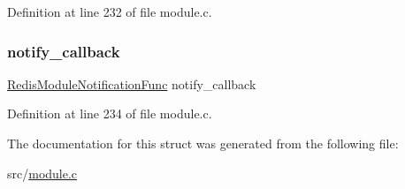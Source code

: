 Definition at line 232 of file module.\+c.

\mbox{\label{struct_redis_module_keyspace_subscriber_aac2bf0df8a745e43f3f56fe2dbb67d93}} 
\subsubsection{\texorpdfstring{notify\+\_\+callback}{notify\_callback}}
{\footnotesize\ttfamily \hyperlink{redismodule_8h_a74883ef8943753c7246ef4eb46516187}{Redis\+Module\+Notification\+Func} notify\+\_\+callback}



Definition at line 234 of file module.\+c.



The documentation for this struct was generated from the following file\+:\begin{DoxyCompactItemize}
\item 
src/\hyperlink{module_8c}{module.\+c}\end{DoxyCompactItemize}
